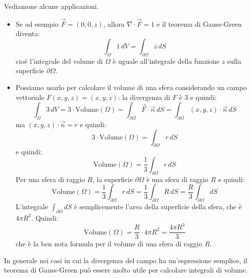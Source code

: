 Vediamone alcune applicazioni.
\begin{itemize}
\item Se ad esempio $\vec{F} = (0, 0, z)$, allora $\nabla \cdot \vec{F} = 1$ e il teorema di Gauss-Green diventa:
  $$
    \int_{\Omega} 1 \, dV = \int_{\partial \Omega} z \, dS
  $$
  cioè l'integrale del volume di $\Omega$ è uguale all'integrale della funzione $z$ sulla superficie $\partial \Omega$.
\item Possiamo usarlo per calcolare il volume di una sfera considerando un campo vettoriale $F(x,y,z)=(x,y,z)$: la divergenza di $F$ è $3$ e quindi:
  $$
    \int_{\Omega} 3 \, dV = 3 \cdot \text{Volume}(\Omega) = \int_{\partial \Omega} \vec{F} \cdot \vec{n} \, dS = \int_{\partial \Omega} (x,y,z) \cdot \vec{n} \, dS
  $$
  ma $(x,y,z) \cdot \vec{n} = r$ e quindi:
  $$
    3 \cdot \text{Volume}(\Omega) = \int_{\partial \Omega} r \, dS
  $$
  e quindi:
  $$
    \text{Volume}(\Omega) = \frac{1}{3} \int_{\partial \Omega} r \, dS
  $$
  Per una sfera di raggio $R$, la superficie $\partial \Omega$ è una sfera di raggio $R$ e quindi:
  $$
    \text{Volume}(\Omega) = \frac{1}{3} \int_{\partial \Omega} r \, dS = \frac{1}{3} \int_{\partial \Omega} R \, dS = \frac{R}{3} \int_{\partial \Omega} dS
  $$
  L'integrale $\int_{\partial \Omega} dS$ è semplicemente l'area della superficie della sfera, che è $4 \pi R^2$. Quindi:
  $$
    \text{Volume}(\Omega) = \frac{R}{3} \cdot 4 \pi R^2 = \frac{4 \pi R^3}{3}
  $$
  che è la ben nota formula per il volume di una sfera di raggio $R$.
\end{itemize}

In generale nei casi in cui la divergenza del campo ha un'espressione semplice, il teorema di Gauss-Green può essere molto utile per calcolare integrali di volume.


